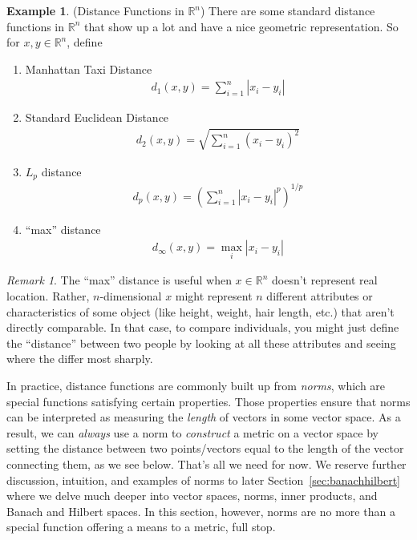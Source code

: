 \documentclass[12pt]{article}
\numberwithin{equation}{section} %
\theoremstyle{plain}
\theoremstyle{definition}
\newtheorem{ex}[thm]{Example}
\theoremstyle{remark}
\newtheorem*{rmk}{Remark}
\newcommand{\R}{\mathbb{R}}
\begin{document}
\begin{ex}{(Distance Functions in $\R^n$)}
There are some standard distance functions in $\R^n$ that show
up a lot and have a nice geometric representation. So for $x,y\in
\R^n$, define
\begin{enumerate}
  \item Manhattan Taxi Distance
    \begin{align*}
      d_1(x,y) = \sum^n_{i=1} |x_i - y_i|
    \end{align*}

  \item Standard Euclidean Distance
    \begin{align*}
      d_2(x,y) = \sqrt{\sum^n_{i=1} (x_i - y_i)^2}
    \end{align*}

  \item $L_p$ distance
    \begin{align*}
      d_p(x,y) = \left(\sum^n_{i=1} |x_i - y_i|^p\right)^{1/p}
    \end{align*}

  \item ``max'' distance
    \begin{align*}
      d_\infty(x,y) = \max_{i} |x_i-y_i|
    \end{align*}

\end{enumerate}
\end{ex}
\begin{rmk}
The ``max'' distance is useful when $x\in\R^n$ doesn't represent
real location. Rather, $n$-dimensional $x$ might represent $n$ different
attributes or characteristics of some object (like height, weight, hair
length, etc.) that aren't directly comparable. In that case, to compare
individuals, you might just define the ``distance'' between two people
by looking at all these attributes and seeing where the differ most
sharply.
\end{rmk}


In practice, distance functions are commonly built up from \emph{norms},
which are special functions satisfying certain properties. Those
properties ensure that norms can be interpreted as measuring the
\emph{length} of vectors in some vector space.
As a result, we can \emph{always} use a norm to \emph{construct} a
metric on a vector space by setting the distance between two
points/vectors equal to the length of the vector connecting them, as we
see below.
That's all we need for now. We reserve further discussion, intuition,
and examples of norms to later Section~\ref{sec:banachhilbert} where we
delve much deeper into vector spaces, norms, inner products, and Banach
and Hilbert spaces. In this section, however, norms are no more than a
special function offering a means to a metric, full stop.
\end{document}
